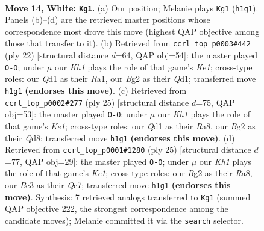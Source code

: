 \documentclass[11pt]{article}
\begin{document}
\clearpage

\begin{figure}[p]\centering
\begin{subfigure}{0.46\textwidth}\centering
\resizebox{\linewidth}{!}{%
\newchessgame
\chessboard[
  setfen={r1bnr1k1/1pppqppp/p4n2/3P4/8/2B1PNP1/PP3PBP/R2Q1R1K w - - 3 14},
  showmover=false,
  pgfstyle=straightmove, color=movearrow, markmove={h1-g1}
]}
\caption{}
\end{subfigure}\hfill
\begin{subfigure}{0.46\textwidth}\centering
\resizebox{\linewidth}{!}{%
\newchessgame
\chessboard[
  setfen={rn3rk1/pp2qppp/3p1n2/3P1b2/4p3/P1B3PN/1P2PPBP/R2QK2R w KQ - 2 12},
  showmover=false,
  pgfstyle=straightmove, color=movearrow, markmove={e1-g1}
]}
\caption{}
\end{subfigure}
\\[4pt]
\begin{subfigure}{0.46\textwidth}\centering
\resizebox{\linewidth}{!}{%
\newchessgame
\chessboard[
  setfen={r2qk2r/4bpp1/p2pbn1p/1p2p3/P3P3/2NQN3/1PP2PPP/R1B2RK1 b kq - 0 13},
  showmover=false,
  pgfstyle=straightmove, color=movearrow, markmove={e8-g8}
]}
\caption{}
\end{subfigure}\hfill
\begin{subfigure}{0.46\textwidth}\centering
\resizebox{\linewidth}{!}{%
\newchessgame
\chessboard[
  setfen={r3k2r/1pq1bpp1/p2pbn1p/4p3/P3P3/2NQN3/1PP2PPP/R1B2RK1 b kq - 2 13},
  showmover=false,
  pgfstyle=straightmove, color=movearrow, markmove={e8-g8}
]}
\caption{}
\end{subfigure}
\caption{\textbf{Move 14, White: \texttt{Kg1}.} (a) Our position; Melanie plays \texttt{Kg1} (\texttt{h1g1}). Panels (b)--(d) are the retrieved master positions whose correspondence most drove this move (highest QAP objective among those that transfer to it). (b) Retrieved from \texttt{ccrl\_top\_p0003\#442} (ply 22) [structural distance $d$=64, QAP obj=54]: the master played \texttt{O-O}; under $\mu$ our \emph{Kh1} plays the role of that game's \emph{Ke1}; cross-type roles: our \emph{Q}d1 as their \emph{R}a1, our \emph{B}g2 as their \emph{Q}d1; transferred move \texttt{h1g1} \textbf{(endorses this move)}. (c) Retrieved from \texttt{ccrl\_top\_p0002\#277} (ply 25) [structural distance $d$=75, QAP obj=53]: the master played \texttt{O-O}; under $\mu$ our \emph{Kh1} plays the role of that game's \emph{Ke1}; cross-type roles: our \emph{Q}d1 as their \emph{R}a8, our \emph{B}g2 as their \emph{Q}d8; transferred move \texttt{h1g1} \textbf{(endorses this move)}. (d) Retrieved from \texttt{ccrl\_top\_p0001\#1280} (ply 25) [structural distance $d$=77, QAP obj=29]: the master played \texttt{O-O}; under $\mu$ our \emph{Kh1} plays the role of that game's \emph{Ke1}; cross-type roles: our \emph{B}g2 as their \emph{R}a8, our \emph{B}c3 as their \emph{Q}c7; transferred move \texttt{h1g1} \textbf{(endorses this move)}. Synthesis: 7 retrieved analogs transferred to \texttt{Kg1} (summed QAP objective 222, the strongest correspondence among the candidate moves); Melanie committed it via the \texttt{search} selector.}
\label{fig:thought-m26}
\end{figure}
\end{document}
